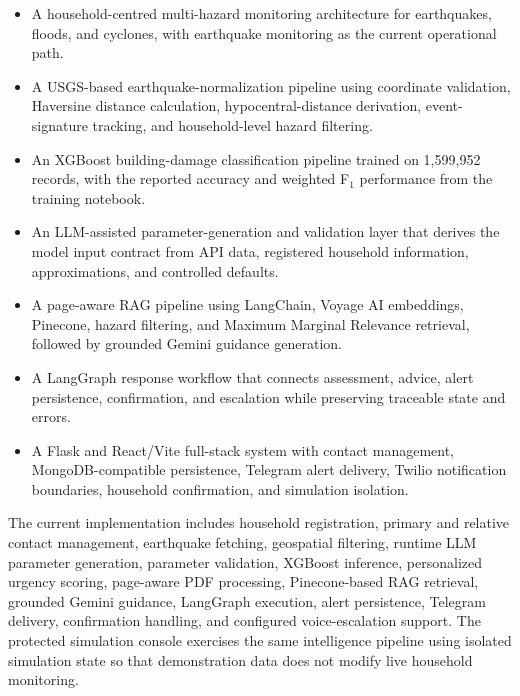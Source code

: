 \begin{itemize}

\item A household-centred multi-hazard monitoring architecture for earthquakes, floods, and cyclones, with earthquake monitoring as the current operational path.

\item A USGS-based earthquake-normalization pipeline using coordinate validation, Haversine distance calculation, hypocentral-distance derivation, event-signature tracking, and household-level hazard filtering.

\item An XGBoost building-damage classification pipeline trained on 1,599,952 records, with the reported accuracy and weighted F$_1$ performance from the training notebook.

\item An LLM-assisted parameter-generation and validation layer that derives the model input contract from API data, registered household information, approximations, and controlled defaults.

\item A page-aware RAG pipeline using LangChain, Voyage AI embeddings, Pinecone, hazard filtering, and Maximum Marginal Relevance retrieval, followed by grounded Gemini guidance generation.

\item A LangGraph response workflow that connects assessment, advice, alert persistence, confirmation, and escalation while preserving traceable state and errors.

\item A Flask and React/Vite full-stack system with contact management, MongoDB-compatible persistence, Telegram alert delivery, Twilio notification boundaries, household confirmation, and simulation isolation.

\end{itemize}

The current implementation includes household registration, primary and relative contact management, earthquake fetching, geospatial filtering, runtime LLM parameter generation, parameter validation, XGBoost inference, personalized urgency scoring, page-aware PDF processing, Pinecone-based RAG retrieval, grounded Gemini guidance, LangGraph execution, alert persistence, Telegram delivery, confirmation handling, and configured voice-escalation support. The protected simulation console exercises the same intelligence pipeline using isolated simulation state so that demonstration data does not modify live household monitoring.

